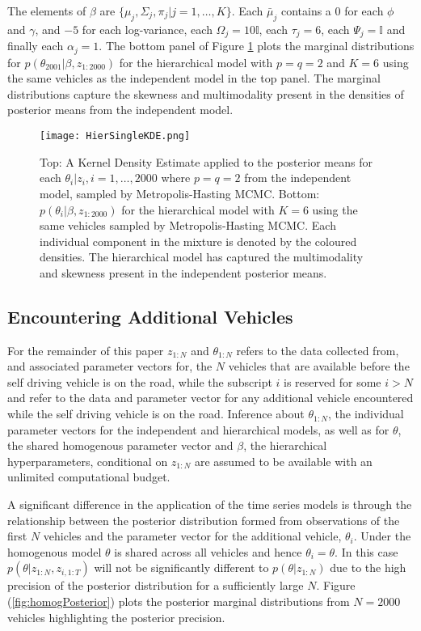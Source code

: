 \documentclass[12pt,a4paper]{article}\usepackage[]{graphicx}\usepackage[]{color}
\begin{document}
The elements of $\beta$ are $\{\mu_j, \Sigma_j, \pi_j | j = 1, \dots, K\}$. Each $\bar{\mu}_j$ contains a $0$ for each $\phi$ and $\gamma$, and $-5$ for each log-variance, each $\Omega_j = 10 \mathbb{I}$, each $\tau_j = 6$, each $\Psi_j = \mathbb{I}$ and finally each $\alpha_j = 1$. The bottom panel of Figure \ref{fig:HierSingleKDE} plots the marginal distributions for $p(\theta_{2001} | \beta, z_{1:2000})$ for the hierarchical model with $p = q = 2$ and $K = 6$ using the same vehicles as the independent model in the top panel. The marginal distributions capture the skewness and multimodality present in the densities of posterior means from the independent model.

\begin{figure}[ht]
\centering
\texttt{[image: HierSingleKDE.png]}
\caption{Top: A Kernel Density Estimate applied to the posterior means for each $\theta_i | z_i, i = 1, \dots, 2000$ where $p = q = 2$ from the independent model, sampled by Metropolis-Hasting MCMC. Bottom: $p(\theta_i | \beta, z_{1:2000})$ for the hierarchical model with $K = 6$ using the same vehicles sampled by Metropolis-Hasting MCMC. Each individual component in the mixture is denoted by the coloured densities. The hierarchical model has captured the multimodality and skewness present in the independent posterior means.}
\label{fig:HierSingleKDE}
\end{figure}

\subsection{Encountering Additional Vehicles}
\label{subsec:additionalVehicles}

For the remainder of this paper $z_{1:N}$ and $\theta_{1:N}$ refers to the data collected from, and associated parameter vectors for, the $N$ vehicles that are available before the self driving vehicle is on the road, while the subscript $i$ is reserved for some $i > N$ and refer to the data and parameter vector for any additional vehicle encountered while the self driving vehicle is on the road.  Inference about $\theta_{1:N}$, the individual parameter vectors for the independent and hierarchical models, as well as for $\theta$, the shared homogenous parameter vector and $\beta$, the hierarchical hyperparameters, conditional on $z_{1:N}$ are assumed to be available with an unlimited computational budget.

A significant difference in the application of the time series models is through the relationship between the posterior distribution formed from observations of the first $N$ vehicles and the parameter vector for the additional vehicle, $\theta_{i}$. Under the homogenous model $\theta$ is shared across all vehicles and hence $\theta_{i} = \theta$. In this case $p(\theta | z_{1:N}, z_{i, 1:T})$ will not be significantly different to $p(\theta | z_{1:N})$ due to the high precision of the posterior distribution for a sufficiently large $N$. Figure (\ref{fig:homogPosterior}) plots the posterior marginal distributions from $N = 2000$ vehicles highlighting the posterior precision.
\end{document}
